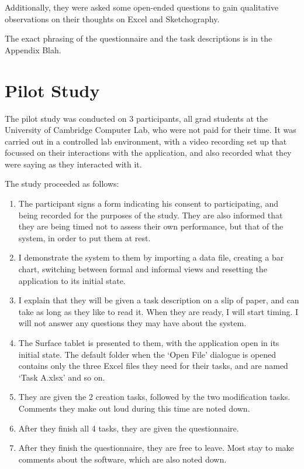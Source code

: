 Additionally, they were asked some open-ended questions to gain qualitative observations on their thoughts on Excel and Sketchography.

The exact phrasing of the questionnaire and the task descriptions is in the Appendix Blah.


\section{Pilot Study}
The pilot study was conducted on 3 participants, all grad students at the University of Cambridge Computer Lab, who were not paid for their time. It was carried out in a controlled lab environment, with a video recording set up that focussed on their interactions with the application, and also recorded what they were saying as they interacted with it.

The study proceeded as follows:
\begin{enumerate}
\item The participant signs a form indicating his consent to participating, and being recorded for the purposes of the study. They are also informed that they are being timed not to assess their own performance, but that of the system, in order to put them at rest.
\item I demonstrate the system to them by importing a data file, creating a bar chart, switching between formal and informal views and resetting the application to its initial state.
\item I explain that they will be given a task description on a slip of paper, and can take as long as they like to read it. When they are ready, I will start timing. I will not answer any questions they may have about the system.
\item The Surface tablet is presented to them, with the application open in its initial state. The default folder when the `Open File' dialogue is opened contains only the three Excel files they need for their tasks, and are named `Task A.xlsx' and so on.
\item They are given the 2 creation tasks, followed by the two modification tasks. Comments they make out loud during this time are noted down. 
\item After they finish all 4 tasks, they are given the questionnaire.
\item After they finish the questionnaire, they are free to leave. Most stay to make comments about the software, which are also noted down.
\end{enumerate}


